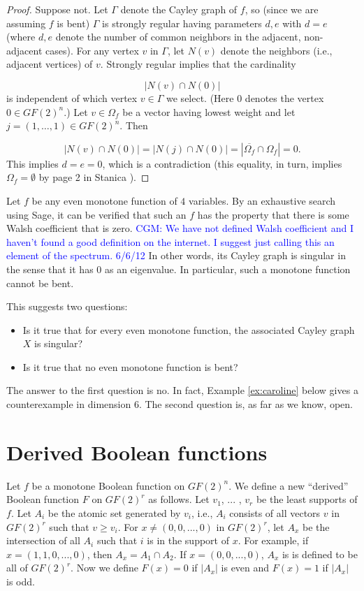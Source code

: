 \documentclass[12pt]{article}
\def\blue#1{\textcolor{blue}{#1}}
\newcommand{\cgm}[1]{\blue{CGM: #1}}
\begin{document}
\begin{proof}
Suppose not. Let $\Gamma$ denote the Cayley graph of $f$, so
(since we are assuming $f$ is bent) $\Gamma$ is strongly regular
having parameters $d,e$ with $d=e$ (where $d,e$ denote the number
of common neighbors in the adjacent, non-adjacent cases).
For any vertex $v$ in $\Gamma$, let $N(v)$ denote the neighbors
(i.e., adjacent vertices) of $v$. Strongly regular implies that the cardinality

\[
|N(v)\cap N(0)|
\]
is independent of which vertex $v \in \Gamma$ we select.
(Here $0$ denotes the vertex $0\in GF(2)^n$.)
Let $v\in \Omega_f$ be a vector having lowest weight
and let $j=(1,\dots,1)\in GF(2)^n$.
Then

\[
|N(v)\cap N(0)| = |N(j)\cap N(0)| = |\overline{\Omega_f}\cap \Omega_f|=0.
\]
This implies $d=e=0$, which is a contradiction (this equality, in turn, implies
$\Omega_f=\emptyset$ by page 2 in Stanica \cite{art:s07}).
\end{proof}

Let $f$ be any even monotone function of $4$ variables. By an
exhaustive search using Sage, it can be verified that such an $f$ has
the property that there is some Walsh coefficient that is zero.
\cgm{We have not defined Walsh coefficient and I haven't found a 
good definition on the internet.  I suggest just calling this an element of 
the spectrum. 6/6/12}
In other words, its Cayley graph is singular in the sense that it
has $0$ as an eigenvalue. In particular, such a monotone function
cannot be bent.

This suggests two questions:
\begin{itemize}
\item
Is it true that for every even monotone function, the associated
Cayley graph $X$ is singular?
\item
Is it true that no even monotone function is bent?
\end{itemize}
The answer to the first question is no. In fact, Example \ref{ex:caroline}
below gives a counterexample in dimension $6$.
The second question is, as far as we know, open.


\section{Derived Boolean functions}

Let $f$ be a monotone Boolean function on $GF(2)^n$.    We define a new ``derived'' Boolean function $F$ on $GF(2)^r$ as follows.
Let $v_1$, ... , $v_r$ be the least supports of $f$.  Let $A_i$ be the atomic set generated by $v_i$, i.e., $A_i$ consists of all vectors $v$ in
$GF(2)^r$ such that $v \geq v_i$.  For $x \neq (0,0,...,0)$ in $GF(2)^r$, let $A_x$ be the intersection of all $A_i$ such that $i$ is in the support of $x$.
For example, if $x=(1,1,0,...,0)$, then $A_x=A_1 \cap A_2$.  If $x=(0,0,...,0)$, $A_x$ is is defined to be all of $GF(2)^r$.
Now we define $F(x)=0$ if $|A_x|$ is even and $F(x)=1$ if $|A_x|$ is odd.
\end{document}
